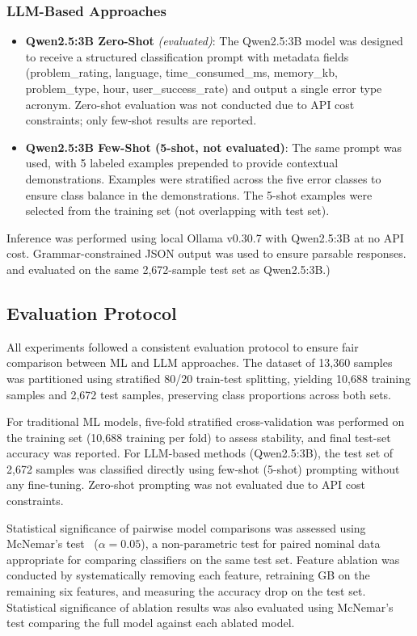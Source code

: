 \documentclass[acmsmall]{acmart}
\begin{document}
\subsubsection*{LLM-Based Approaches}
\begin{itemize}
    \item \textbf{Qwen2.5:3B Zero-Shot} \textit{(evaluated)}: The
          Qwen2.5:3B model was designed to receive a structured classification
          prompt with metadata fields (problem\_rating, language,
          time\_consumed\_ms, memory\_kb, problem\_type, hour,
          user\_success\_rate) and output a single error type acronym.
          Zero-shot evaluation was not conducted due to API cost constraints;
          only few-shot results are reported.
    \item \textbf{Qwen2.5:3B Few-Shot (5-shot, not evaluated)}: The same prompt was used,
          with 5 labeled examples prepended to provide contextual
          demonstrations. Examples were stratified across the five error
          classes to ensure class balance in the demonstrations. The 5-shot
          examples were selected from the training set (not overlapping with
          test set).
\end{itemize}

Inference was performed using local Ollama v0.30.7 with Qwen2.5:3B
at no API cost. Grammar-constrained JSON output was used to ensure
parsable responses.
and evaluated on the same 2,672-sample test set as Qwen2.5:3B.)

\subsection{Evaluation Protocol}

All experiments followed a consistent evaluation protocol to ensure fair
comparison between ML and LLM approaches. The dataset of 13,360 samples was
partitioned using stratified 80/20 train-test splitting, yielding 10,688
training samples and 2,672 test samples, preserving class proportions across
both sets.

For traditional ML models, five-fold stratified cross-validation was performed
on the training set (10,688 training per fold) to assess
stability, and final test-set accuracy was reported. For LLM-based methods
(Qwen2.5:3B), the test set of 2,672 samples was classified directly using
few-shot (5-shot) prompting without any fine-tuning. Zero-shot prompting
was not evaluated due to API cost constraints.

Statistical significance of pairwise model comparisons was assessed using
McNemar's test~\cite{mcnemar1947note} ($\alpha = 0.05$), a non-parametric test
for paired nominal data appropriate for comparing classifiers on the same test
set. Feature ablation was conducted by systematically removing each feature,
retraining GB on the remaining six features, and measuring the accuracy
drop on the test set. Statistical significance of ablation results was also
evaluated using McNemar's test comparing the full model against each ablated
model.
\end{document}
